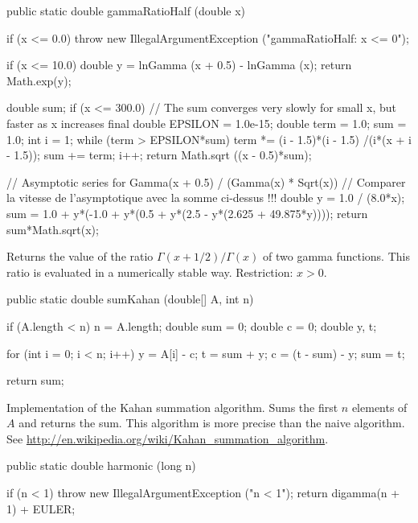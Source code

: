 \begin{code}

   public static double gammaRatioHalf (double x)\begin{hide} {
      if (x <= 0.0)
         throw new IllegalArgumentException ("gammaRatioHalf:   x <= 0");

      if (x <= 10.0) {
         double y = lnGamma (x + 0.5) - lnGamma (x);
         return Math.exp(y);
      }

      double sum;
      if (x <= 300.0) {
         // The sum converges very slowly for small x, but faster as x increases
         final double EPSILON = 1.0e-15;
         double term = 1.0;
         sum = 1.0;
         int i = 1;
         while (term > EPSILON*sum) {
            term *= (i - 1.5)*(i - 1.5) /(i*(x + i - 1.5));
            sum += term;
            i++;
         }
         return Math.sqrt ((x - 0.5)*sum);
      }

      // Asymptotic series for Gamma(x + 0.5) / (Gamma(x) * Sqrt(x))
      // Comparer la vitesse de l'asymptotique avec la somme ci-dessus !!!
      double y = 1.0 / (8.0*x);
      sum = 1.0 + y*(-1.0 + y*(0.5 + y*(2.5 - y*(2.625 + 49.875*y))));
      return sum*Math.sqrt(x);
   }\end{hide}
\end{code}
\begin{tabb}
Returns the value of the ratio $\Gamma(x+1/2)/\Gamma(x)$ of two gamma
functions. This ratio is evaluated in a numerically stable way.
Restriction: $x>0$.
\end{tabb}
\begin{code}

   public static double sumKahan (double[] A, int n) \begin{hide} {
      if (A.length < n)
         n = A.length;
      double sum = 0;
      double c = 0;
      double y, t;

      for (int i = 0; i < n; i++) {
        y = A[i] - c;
        t = sum + y;
        c = (t - sum) - y;
        sum = t;
      }

      return sum;
   }\end{hide}
\end{code}
\begin{tabb}
 Implementation of the Kahan summation algorithm.
Sums the first $n$ elements of $A$ and returns the sum.
This algorithm is more precise than the naive algorithm.
See  \url{http://en.wikipedia.org/wiki/Kahan_summation_algorithm}.
\end{tabb}
\begin{code}

   public static double harmonic (long n)\begin{hide} {
      if (n < 1)
         throw new IllegalArgumentException ("n < 1");
      return digamma(n + 1) + EULER;
   }\end{hide}
\end{code}
